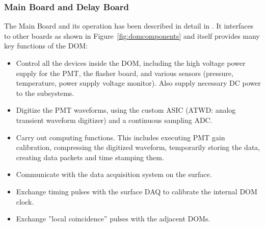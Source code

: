 
\subsubsection{\label{sec:mainboard}Main Board and Delay Board}
The Main Board and its operation has been described in detail in \cite{ref:domdaq}.  
It interfaces to other boards as shown in
Figure~\ref{fig:domcomponents} and itself provides many key functions of the DOM:

\begin{itemize}
\item{Control all the devices inside the DOM, including the high voltage power supply for the PMT, 
the flasher board, and various sensors (pressure, temperature, power supply voltage monitor). 
Also supply necessary DC power to the subsystems.}
\item{Digitize the PMT waveforms, using the custom ASIC (ATWD: analog transient waveform digitizer) and a continuous sampling ADC.}
\item{Carry out computing functions. This includes executing PMT gain calibration, compressing 
the digitized waveform, temporarily storing the data, creating data packets and time stamping them.}
\item{Communicate with the data acquisition system on the surface.}
\item{Exchange timing pulses with the surface DAQ to calibrate the internal DOM clock. }
\item{Exchange ”local coincidence” pulses with the adjacent DOMs.}
\end{itemize}

